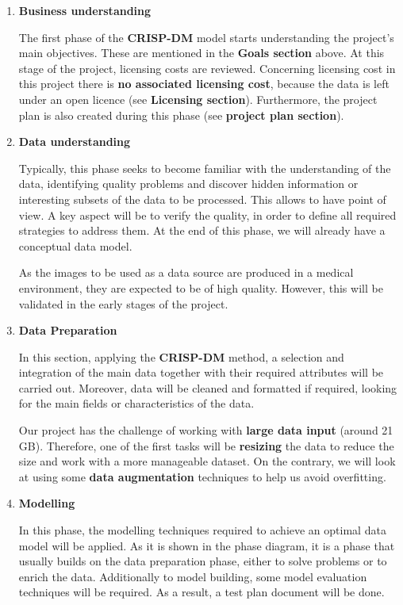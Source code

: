 \begin{enumerate}
    \item \textbf{Business understanding}
    
    The first phase of the \textbf{CRISP-DM} model starts understanding the project's main objectives. These are mentioned in the \textbf{ Goals section} above. At this stage of the project, licensing costs are reviewed. Concerning licensing cost in this project there is \textbf{no associated licensing cost}, because the data is left under an open licence (see \textbf{Licensing section}). Furthermore, the project plan is also created during this phase (see \textbf{project plan section}).

    \item \textbf{Data understanding}
    
    Typically, this phase seeks to become familiar with the understanding of the data, identifying quality problems and discover hidden information or interesting subsets of the data to be processed. This allows to have point of view. A key aspect will be to verify the quality, in order to define all required strategies to address them. At the end of this phase, we will already have a conceptual data model.

    As the images to be used as a data source are produced in a medical environment, they are expected to be of high quality. However, this will be validated in the early stages of the project.

        
    \item \textbf{Data Preparation}

    In this section, applying the \textbf{CRISP-DM} method, a selection and integration of the main data together with their required attributes will be carried out. Moreover, data will be cleaned and formatted if required, looking for the main fields or characteristics of the data.

    Our project has the challenge of working with \textbf{large data input} (around 21 GB). Therefore, one of the first tasks will be \textbf{resizing} the data to reduce the size and work with a more manageable dataset. On the contrary, we will look at using some \textbf{data augmentation} techniques to help us avoid overfitting. 
    
    \item \textbf{Modelling}

    In this phase, the modelling techniques required to achieve an optimal data model will be applied. As it is  shown in the phase diagram, it is a phase that usually builds on the data preparation phase, either to solve problems or to enrich the data. Additionally to model building, some model evaluation techniques will be required. As a result, a test plan document will be done.


\end{enumerate}
